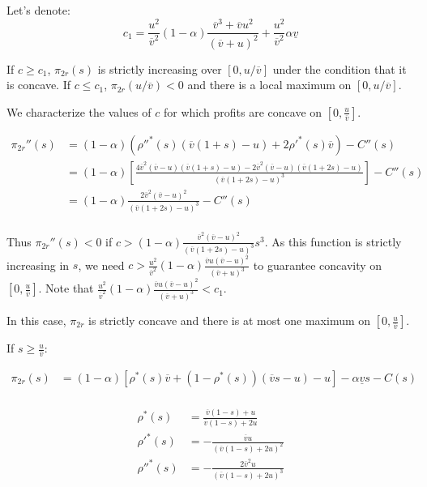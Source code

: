 \documentclass[a4paper,leqno]{article}%
\renewcommand{\a}{\alpha}
\newcommand{\uv}{\underline{v}}
\newcommand{\ov}{\overline{v}}
\begin{document}
Let's denote: $$c_1=\frac{u^2}{\ov^2}(1-\a)\frac{\ov^3+\ov u^2}{(\ov+u)^2}+\frac{u^2}{\ov^2}\a \uv$$

If $c\geq c_1$, $\pi_{2r}(s)$ is strictly increasing over $[0,u/\ov]$ under the condition that it is concave. If $c\leq c_1$, $\pi_{2r}(u/\ov)<0$ and there is a local maximum on $[0,u/\ov]$. 

We characterize the values of $c$ for which profits are concave on $[0,\frac{u}{\ov}]$.


\begin{equation}
    \begin{aligned}
\pi_{2r}''(s)&=(1-\a)(\rho''^*(s)(\ov(1+s)-u)+2\rho'^*(s)\ov)-C''(s)\\
            &= (1-\a)\left[\frac{4\ov^2(\ov-u)(\ov(1+s)-u)-2\ov^2(\ov-u)(\ov(1+2s)-u)}{(\ov(1+2s)-u)^3}\right]-C''(s)\\
            &= (1-\a)\frac{2\ov^2(\ov-u)^2}{(\ov(1+2s)-u)^3}-C''(s)\\
    \end{aligned}
\end{equation}


Thus $\pi_{2r}''(s)<0$ if $c>(1-\a)\frac{\ov^2(\ov-u)^2}{(\ov(1+2s)-u)^3}s^3$. As this function is strictly increasing in $s$, we need $c>\frac{u^2}{\ov^2}(1-\a)\frac{\ov u (\ov-u)^2}{(\ov+u)^3}$ to guarantee concavity on $[0,\frac{u}{\ov}]$. Note that $\frac{u^2}{\ov^2}(1-\a)\frac{\ov u (\ov-u)^2}{(\ov+u)^3}<c_1$.

In this case, $\pi_{2r}$ is strictly concave and there is at most one maximum on $[0,\frac{u}{\ov}]$. 

\bigskip

If $s\geq\frac{u}{\ov}$:

\begin{equation}
    \begin{aligned}
\pi_{2r}(s)&=(1-\a)[\rho^*(s)\ov+(1-\rho^*(s))(\ov s-u)-u]-\a\uv s-C(s)\\
    \end{aligned}
\end{equation}



\begin{equation}
    \begin{aligned}
\rho^*(s)&=\frac{\ov(1-s)+u}{\ov(1-s)+2u}\\
\rho'^{*}(s)&=-\frac{\ov u}{(\ov(1-s)+2u)^2}\\
\rho''^{*}(s)&=-\frac{2\ov^2u}{(\ov(1-s)+2u)^3}
    \end{aligned}
\end{equation}
\end{document}
